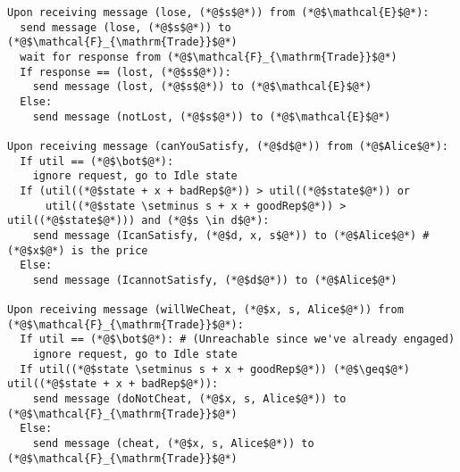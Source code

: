 \begin{lstlisting}[label=satprot, style=numbers]
Upon receiving message (lose, (*@$s$@*)) from (*@$\mathcal{E}$@*):
  send message (lose, (*@$s$@*)) to (*@$\mathcal{F}_{\mathrm{Trade}}$@*)
  wait for response from (*@$\mathcal{F}_{\mathrm{Trade}}$@*)
  If response == (lost, (*@$s$@*)):
    send message (lost, (*@$s$@*)) to (*@$\mathcal{E}$@*)
  Else:
    send message (notLost, (*@$s$@*)) to (*@$\mathcal{E}$@*)

Upon receiving message (canYouSatisfy, (*@$d$@*)) from (*@$Alice$@*):
  If util == (*@$\bot$@*):
    ignore request, go to Idle state
  If (util((*@$state + x + badRep$@*)) > util((*@$state$@*)) or
      util((*@$state \setminus s + x + goodRep$@*)) > util((*@$state$@*))) and (*@$s \in d$@*):
    send message (IcanSatisfy, (*@$d, x, s$@*)) to (*@$Alice$@*) # (*@$x$@*) is the price
  Else:
    send message (IcannotSatisfy, (*@$d$@*)) to (*@$Alice$@*)

Upon receiving message (willWeCheat, (*@$x, s, Alice$@*)) from (*@$\mathcal{F}_{\mathrm{Trade}}$@*):
  If util == (*@$\bot$@*): # (Unreachable since we've already engaged)
    ignore request, go to Idle state
  If util((*@$state \setminus s + x + goodRep$@*)) (*@$\geq$@*) util((*@$state + x + badRep$@*)):
    send message (doNotCheat, (*@$x, s, Alice$@*)) to (*@$\mathcal{F}_{\mathrm{Trade}}$@*)
  Else:
    send message (cheat, (*@$x, s, Alice$@*)) to (*@$\mathcal{F}_{\mathrm{Trade}}$@*)
\end{lstlisting}
